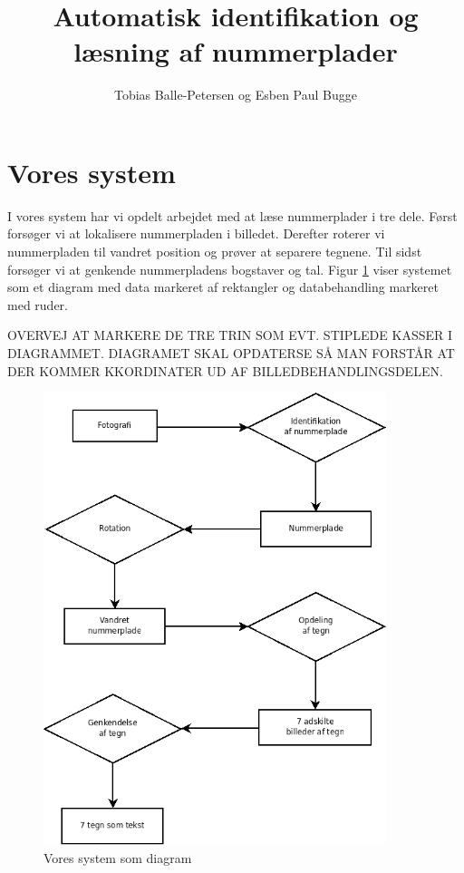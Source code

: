 \documentclass[11pt,a4paper,final]{article}
\author{Tobias Balle-Petersen og Esben Paul Bugge}
\title{Automatisk identifikation og læsning af nummerplader}
\begin{document}
\maketitle
\newpage
\tableofcontents
\newpage




\section{Vores system}
I vores system har vi opdelt arbejdet med at læse nummerplader i tre dele. Først forsøger vi at lokalisere nummerpladen i billedet. Derefter roterer vi nummerpladen til vandret position og prøver at separere tegnene. Til sidst forsøger vi at genkende nummerpladens bogstaver og tal. Figur \ref{fig:system_overblik} viser systemet som et diagram med data markeret af rektangler og databehandling markeret med ruder.

OVERVEJ AT MARKERE DE TRE TRIN SOM EVT. STIPLEDE KASSER I DIAGRAMMET. DIAGRAMET SKAL OPDATERSE SÅ MAN FORSTÅR AT DER KOMMER KKORDINATER UD AF BILLEDBEHANDLINGSDELEN.
\begin{figure}[htp]
\centering
\includegraphics[width=10cm]{system/illu/overordnet_system.png} 
\caption{Vores system som diagram}
\label{fig:system_overblik}
\end{figure}
\end{document}
